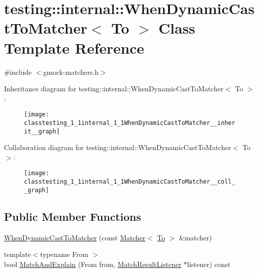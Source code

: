 \hypertarget{classtesting_1_1internal_1_1WhenDynamicCastToMatcher}{}\section{testing\+:\+:internal\+:\+:When\+Dynamic\+Cast\+To\+Matcher$<$ To $>$ Class Template Reference}
\label{classtesting_1_1internal_1_1WhenDynamicCastToMatcher}


{\ttfamily \#include $<$gmock-\/matchers.\+h$>$}



Inheritance diagram for testing\+:\+:internal\+:\+:When\+Dynamic\+Cast\+To\+Matcher$<$ To $>$\+:
\nopagebreak
\begin{figure}[H]
\begin{center}
\leavevmode
\texttt{[image: classtesting\_1\_1internal\_1\_1WhenDynamicCastToMatcher\_\_inherit\_\_graph]}
\end{center}
\end{figure}


Collaboration diagram for testing\+:\+:internal\+:\+:When\+Dynamic\+Cast\+To\+Matcher$<$ To $>$\+:
\nopagebreak
\begin{figure}[H]
\begin{center}
\leavevmode
\texttt{[image: classtesting\_1\_1internal\_1\_1WhenDynamicCastToMatcher\_\_coll\_\_graph]}
\end{center}
\end{figure}
\subsection*{Public Member Functions}
\begin{DoxyCompactItemize}
\item 
\hyperlink{classtesting_1_1internal_1_1WhenDynamicCastToMatcher_a44e444d218197f8180c5ac7fca135f9a}{When\+Dynamic\+Cast\+To\+Matcher} (const \hyperlink{classtesting_1_1Matcher}{Matcher}$<$ \hyperlink{classtesting_1_1internal_1_1To}{To} $>$ \&matcher)
\item 
{\footnotesize template$<$typename From $>$ }\\bool \hyperlink{classtesting_1_1internal_1_1WhenDynamicCastToMatcher_afea5e5230fa9955bfdf9902587c44676}{Match\+And\+Explain} (From from, \hyperlink{classtesting_1_1MatchResultListener}{Match\+Result\+Listener} $\ast$listener) const 
\end{DoxyCompactItemize}
